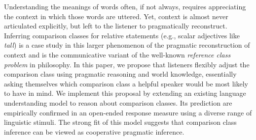 \documentclass[doc, floatsintext]{apa6}
\begin{document}
Understanding the meanings of words often, if not always, requires appreciating the context in which those words are uttered.
Yet, context is almost never articulated explicitly, but left to the listener to pragmatically reconstruct.
Inferring comparison classes for relative statements (e.g., scalar adjectives like \emph{tall}) is a case study in this larger phenomenon of the pragmatic reconstruction of context and is the communicative variant of the well-known \emph{reference class problem} in philosophy.
In this paper, we propose that listeners flexibly adjust the comparison class using pragmatic reasoning and world knowledge, essentially asking themselves which comparison class a helpful speaker would be most likely to have in mind. 
We implement this proposal by extending an existing language understanding model to reason about comparison classes. Its prediction are empirically confirmed in an open-ended response measure using a diverse range of linguistic stimuli.
The strong fit of this model suggests that comparison class inference can be viewed as cooperative pragmatic inference.
\end{document}
